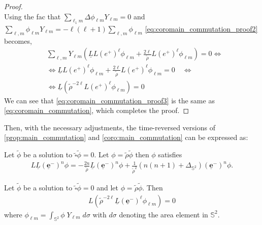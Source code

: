 \begin{proof}
\begin{equation}
  \end{equation}
  Using the fac that $\sum_{\ell_{1} m} \Delta \phi_{\ell m} Y_{\ell m}=0$ and $\sum_{\ell, m} \phi_{\ell m} Y_{\ell m}=-\ell(\ell+1) \sum_{\ell, m} \phi_{\ell m}$ \eqref{eq:coromain_commutation_proof2} becomes,
  \begin{align}\label{eq:coromain_commutation_proof3}
    & \sum_{\ell, m} Y_{\ell m}\left(\underline{L} L\left(e^{+}\right)^{\ell} \phi_{\ell m}+\frac{2 \ell}{\tilde{\rho}} L\left(e^{+}\right)^{\ell} \phi_{\ell m}\right)=0 \Leftrightarrow \nonumber \\
    & \Leftrightarrow \underline{L} L\left(e^{+}\right)^{\ell} \phi_{\ell m}+\frac{2 \ell}{\tilde{\rho}} L\left(e^{+}\right)^{\ell} \phi_{\ell m}=0 \quad \Leftrightarrow \nonumber \\
    & \Leftrightarrow \underline{L}\left(\tilde{\rho}^{-2 \ell} L\left(e^{+}\right)^{\ell} \phi_{\ell m}\right)=0
  \end{align}
  We can see that \eqref{eq:coromain_commutation_proof3} is the same as \eqref{eq:coromain_commutation}, which completes the proof.   
\end{proof}
Then, with the necessary adjustments, the time-reversed versions of \ref{prop:main_commutation} and \ref{coro:main_commutation} can be expressed as:
\begin{proposition}\label{prop:main_commutation_minus}
  Let $\tilde{\phi}$ be a solution to
  $\tilde{\square}\tilde{\phi}=0$.  Let $\phi =
  \tilde{\rho}\tilde{\phi}$ then $\phi$ satisfies
 \begin{align}\label{eq:main_commutation_minus}
   L \underline{L} (\boldsymbol{\underline{e}}^{-})^n \phi = -\frac{2n}{\tilde{\rho}}\underline{L}
   (\boldsymbol{\underline{e}}^{-})^n \phi + \frac{1}{\tilde{\rho}^2}(n(n+1) +
   \Delta_{\mathbb{S}^2})(\boldsymbol{\underline{e}}^{-})^n \phi.
 \end{align}
\end{proposition}
\begin{corollary}\label{coro:main_commutation_minus}
  Let $\tilde{\phi}$ be a solution to
  $\tilde{\square}\tilde{\phi}=0$ and let $\phi =
  \tilde{\rho}\tilde{\phi}$. Then
  \begin{align}\label{eq:coromain_commutation_minus}
  L (\tilde{\rho}^{-2\ell} \underline{L} (\boldsymbol{\underline{e}}^{-})^{\ell}\phi_{\ell m}) = 0
  \end{align}
  where $\phi_{\ell m}= \int_{\mathbb{S}^2} \phi \; Y_{\ell m} \;
  d\sigma$ with $d\sigma$ denoting the area element in $\mathbb{S}^2$.
\end{corollary}
